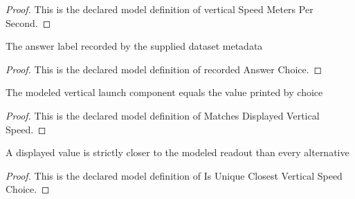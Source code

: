 \begin{proof}
  This is the declared model definition of vertical Speed Meters Per Second.
\end{proof}
\begin{definition}
  \label{def:physics:phyx-mini-0749:phyxminiproblems-problemphyxmini0749-recordedanswerchoice}
  The answer label recorded by the supplied dataset metadata
\end{definition}
\begin{proof}
  This is the declared model definition of recorded Answer Choice.
\end{proof}
\begin{definition}
  \label{def:physics:phyx-mini-0749:phyxminiproblems-problemphyxmini0749-matchesdisplayedverticalspeed}
  The modeled vertical launch component equals the value printed by choice
\end{definition}
\begin{proof}
  This is the declared model definition of Matches Displayed Vertical Speed.
\end{proof}
\begin{definition}
  \label{def:physics:phyx-mini-0749:phyxminiproblems-problemphyxmini0749-isuniqueclosestverticalspeedchoice}
  A displayed value is strictly closer to the modeled readout than every alternative
\end{definition}
\begin{proof}
  This is the declared model definition of Is Unique Closest Vertical Speed Choice.
\end{proof}
